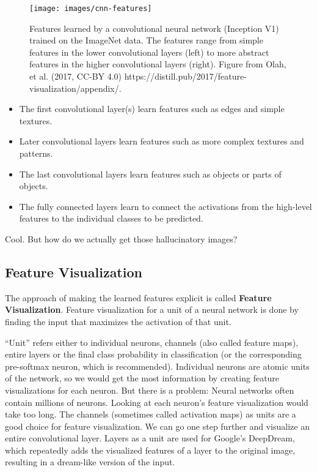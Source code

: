\documentclass[
  11pt,
]{scrbook}
\providecommand{\tightlist}{%
  \setlength{\itemsep}{0pt}\setlength{\parskip}{0pt}}
\begin{document}
\begin{figure}

{\centering \texttt{[image: images/cnn-features]} 

}

\caption{Features learned by a convolutional neural network (Inception V1) trained on the ImageNet data. The features range from simple features in the lower convolutional layers (left) to more abstract features in the higher convolutional layers (right). Figure from Olah, et al. (2017, CC-BY 4.0) https://distill.pub/2017/feature-visualization/appendix/.}\label{fig:unnamed-chunk-53}
\end{figure}

\begin{itemize}
\tightlist
\item
  The first convolutional layer(s) learn features such as edges and simple textures.
\item
  Later convolutional layers learn features such as more complex textures and patterns.
\item
  The last convolutional layers learn features such as objects or parts of objects.
\item
  The fully connected layers learn to connect the activations from the high-level features to the individual classes to be predicted.
\end{itemize}

Cool.
But how do we actually get those hallucinatory images?

\hypertarget{feature-visualization}{%
\subsection{Feature Visualization}\label{feature-visualization}}

The approach of making the learned features explicit is called \textbf{Feature Visualization}.
Feature visualization for a unit of a neural network is done by finding the input that maximizes the activation of that unit.

``Unit'' refers either to individual neurons, channels (also called feature maps), entire layers or the final class probability in classification (or the corresponding pre-softmax neuron, which is recommended).
Individual neurons are atomic units of the network, so we would get the most information by creating feature visualizations for each neuron.
But there is a problem:
Neural networks often contain millions of neurons.
Looking at each neuron's feature visualization would take too long.
The channels (sometimes called activation maps) as units are a good choice for feature visualization.
We can go one step further and visualize an entire convolutional layer.
Layers as a unit are used for Google's DeepDream, which repeatedly adds the visualized features of a layer to the original image, resulting in a dream-like version of the input.
\end{document}
